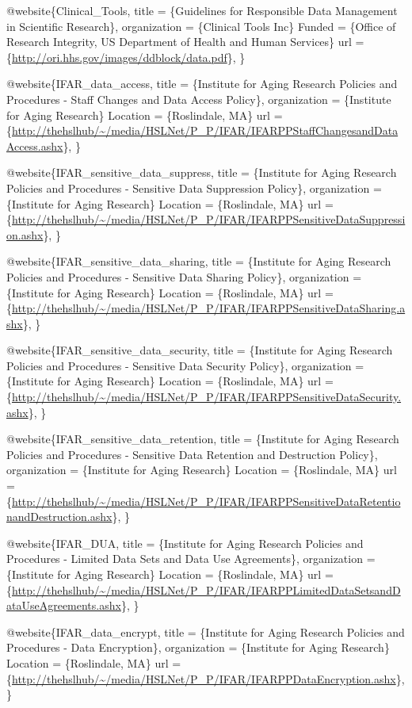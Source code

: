 \documentclass[]{book}
\theoremstyle{definition}
\theoremstyle{definition}
\theoremstyle{definition}
\theoremstyle{remark}
\begin{document}
@website\{Clinical\_Tools, title = \{Guidelines for Responsible Data
Management in Scientific Research\}, organization = \{Clinical Tools
Inc\} Funded = \{Office of Research Integrity, US Department of Health
and Human Services\} url =
\{\url{http://ori.hhs.gov/images/ddblock/data.pdf}\}, \}

@website\{IFAR\_data\_access, title = \{Institute for Aging Research
Policies and Procedures - Staff Changes and Data Access Policy\},
organization = \{Institute for Aging Research\} Location = \{Roslindale,
MA\} url =
\{\url{http://thehslhub/~/media/HSLNet/P_P/IFAR/IFARPPStaffChangesandDataAccess.ashx}\},
\}

@website\{IFAR\_sensitive\_data\_suppress, title = \{Institute for Aging
Research Policies and Procedures - Sensitive Data Suppression Policy\},
organization = \{Institute for Aging Research\} Location = \{Roslindale,
MA\} url =
\{\url{http://thehslhub/~/media/HSLNet/P_P/IFAR/IFARPPSensitiveDataSuppression.ashx}\},
\}

@website\{IFAR\_sensitive\_data\_sharing, title = \{Institute for Aging
Research Policies and Procedures - Sensitive Data Sharing Policy\},
organization = \{Institute for Aging Research\} Location = \{Roslindale,
MA\} url =
\{\url{http://thehslhub/~/media/HSLNet/P_P/IFAR/IFARPPSensitiveDataSharing.ashx}\},
\}

@website\{IFAR\_sensitive\_data\_security, title = \{Institute for Aging
Research Policies and Procedures - Sensitive Data Security Policy\},
organization = \{Institute for Aging Research\} Location = \{Roslindale,
MA\} url =
\{\url{http://thehslhub/~/media/HSLNet/P_P/IFAR/IFARPPSensitiveDataSecurity.ashx}\},
\}

@website\{IFAR\_sensitive\_data\_retention, title = \{Institute for
Aging Research Policies and Procedures - Sensitive Data Retention and
Destruction Policy\}, organization = \{Institute for Aging Research\}
Location = \{Roslindale, MA\} url =
\{\url{http://thehslhub/~/media/HSLNet/P_P/IFAR/IFARPPSensitiveDataRetentionandDestruction.ashx}\},
\}

@website\{IFAR\_DUA, title = \{Institute for Aging Research Policies and
Procedures - Limited Data Sets and Data Use Agreements\}, organization =
\{Institute for Aging Research\} Location = \{Roslindale, MA\} url =
\{\url{http://thehslhub/~/media/HSLNet/P_P/IFAR/IFARPPLimitedDataSetsandDataUseAgreements.ashx}\},
\}

@website\{IFAR\_data\_encrypt, title = \{Institute for Aging Research
Policies and Procedures - Data Encryption\}, organization = \{Institute
for Aging Research\} Location = \{Roslindale, MA\} url =
\{\url{http://thehslhub/~/media/HSLNet/P_P/IFAR/IFARPPDataEncryption.ashx}\},
\}
\end{document}
